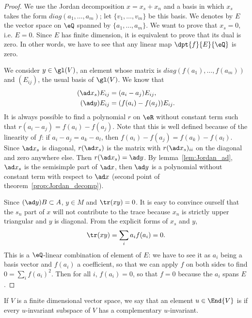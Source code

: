 \begin{proof}
We use the Jordan decomposition $x=x_s+x_n$ and a basis in which $x_s$ takes the form $diag(a_1,\ldots,a_m)$; let $\{v_1,\ldots,v_m\}$ be this basis. We denotes by $E$ the vector space on $\eQ$ spanned by $\{a_1,\ldots,a_m\}$. We want to prove that $x_s=0$, i.e. $E=0$. Since $E$ has finite dimension, it is equivalent to prove that its dual is zero. In other words, we have to see that any linear map $\dpt{f}{E}{\eQ}$ is zero.

We consider $y\in\gl(V)$, an element whose matrix is $diag(f(a_1),\ldots,f(a_m))$ and $(E_{ij})$, the usual basis of $\gl(V)$. We know that
\begin{subequations}
\begin{align}
  (\ad x_s)E_{ij}&=(a_i-a_j)E_{ij},\\
  (\ad y)E_{ij}&=(f(a_i)-f(a_j))E_{ij}.
\end{align}
\end{subequations}
It is always possible to find a polynomial $r$ on $\eR$ without constant term such that $r(a_i-a_j)=f(a_i)-f(a_j)$. Note that this is well defined because of the linearity of $f$: if $a_i-a_j=a_k-a_l$, then $f(a_i)-f(a_j)=f(a_k)-f(a_l)$. Since $\ad x_s$ is diagonal, $r(\ad x_s)$ is the matrix with $r(\ad x_s)_{ii}$ on the diagonal and zero anywhere else. Then $r(\ad x_s)=\ad y$. By lemma~\ref{lem:Jordan_ad}, $\ad x_s$ is the semisimple part of $\ad x$, then $\ad y$ is  a polynomial without constant term with respect to $\ad x$ (second point of theorem~\ref{prop:Jordan_decomp}).

Since $(\ad y)B\subset A$, $y\in M$ and $\tr(xy)=0$. It is easy to convince ourself that the $s_n$ part of $x$ will not contribute to the trace because $x_n$ is strictly upper triangular and $y$ is diagonal. From the explicit forms of $x_s$ and $y$,
\[
  \tr(xy)=\sum_ia_if(a_i)=0.
\]
This is a $\eQ$-linear combination of element of $E$: we have to see it as $a_i$ being a basis vector and $f(a_i)$ a coefficient, so that we can apply $f$ on both sides to find $0=\sum_if(a_i)^2$. Then for all $i$, $f(a_i)=0$, so that $f=0$ because  the $a_i$ spans $E$.
\end{proof}

\begin{definition}
    If $V$ is a finite dimensional vector space, we say that an element $u\in\End{V}$ is \label{pg:def_semisimple} if every \( u\)-invariant subspace of \( V\) has a complementary \( u\)-invariant.
\end{definition}

